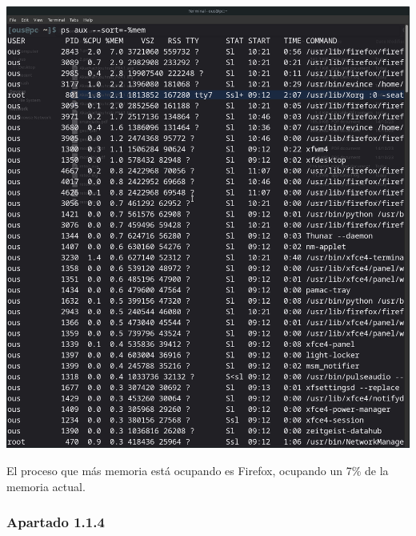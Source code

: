\documentclass[spanish]{article}
\begin{document}
\begin{center}
\includegraphics[scale=.3]{../img/3.png}
\end{center}

El proceso que más memoria está ocupando es Firefox, ocupando un 7\% de la
memoria actual.

\newpage

\subsubsection{Apartado 1.1.4}
\end{document}
